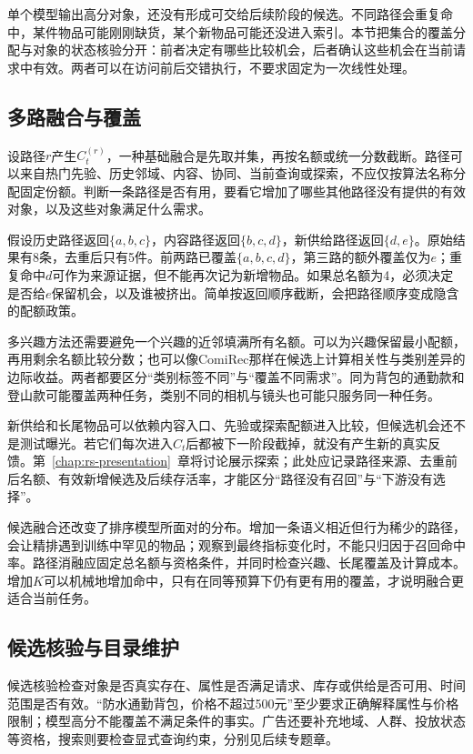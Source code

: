 单个模型输出高分对象，还没有形成可交给后续阶段的候选。不同路径会重复命中，某件物品可能刚刚缺货，某个新物品可能还没进入索引。本节把集合的覆盖分配与对象的状态核验分开：前者决定有哪些比较机会，后者确认这些机会在当前请求中有效。两者可以在访问前后交错执行，不要求固定为一次线性处理。

\subsection{多路融合与覆盖}
\label{sec:rs-candidate-fusion}

设路径$r$产生$C_t^{(r)}$，一种基础融合是先取并集，再按名额或统一分数截断。路径可以来自热门先验、历史邻域、内容、协同、当前查询或探索，不应仅按算法名称分配固定份额。判断一条路径是否有用，要看它增加了哪些其他路径没有提供的有效对象，以及这些对象满足什么需求。

假设历史路径返回$\{a,b,c\}$，内容路径返回$\{b,c,d\}$，新供给路径返回$\{d,e\}$。原始结果有8条，去重后只有5件。前两路已覆盖$\{a,b,c,d\}$，第三路的额外覆盖仅为$e$；重复命中$d$可作为来源证据，但不能再次记为新增物品。如果总名额为4，必须决定是否给$e$保留机会，以及谁被挤出。简单按返回顺序截断，会把路径顺序变成隐含的配额政策。

多兴趣方法还需要避免一个兴趣的近邻填满所有名额。可以为兴趣保留最小配额，再用剩余名额比较分数；也可以像ComiRec那样在候选上计算相关性与类别差异的边际收益。两者都要区分“类别标签不同”与“覆盖不同需求”。同为背包的通勤款和登山款可能覆盖两种任务，类别不同的相机与镜头也可能只服务同一种任务。

新供给和长尾物品可以依赖内容入口、先验或探索配额进入比较，但候选机会还不是测试曝光。若它们每次进入$C_t$后都被下一阶段截掉，就没有产生新的真实反馈。第~\ref{chap:rs-presentation}~章将讨论展示探索；此处应记录路径来源、去重前后名额、有效新增候选及后续存活率，才能区分“路径没有召回”与“下游没有选择”。

候选融合还改变了排序模型所面对的分布。增加一条语义相近但行为稀少的路径，会让精排遇到训练中罕见的物品；观察到最终指标变化时，不能只归因于召回命中率。路径消融应固定总名额与资格条件，并同时检查兴趣、长尾覆盖及计算成本。增加$K$可以机械地增加命中，只有在同等预算下仍有更有用的覆盖，才说明融合更适合当前任务。

\subsection{候选核验与目录维护}
\label{sec:rs-candidate-maintenance}

候选核验检查对象是否真实存在、属性是否满足请求、库存或供给是否可用、时间范围是否有效。“防水通勤背包，价格不超过500元”至少要求正确解释属性与价格限制；模型高分不能覆盖不满足条件的事实。广告还要补充地域、人群、投放状态等资格，搜索则要检查显式查询约束，分别见后续专题章。

